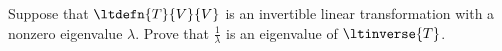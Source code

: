Suppose that $\ltdefn{T}{V}{V}$ is an invertible linear transformation with a nonzero eigenvalue $\lambda$.  Prove that $\displaystyle\frac{1}{\lambda}$ is an eigenvalue of $\ltinverse{T}$. 
